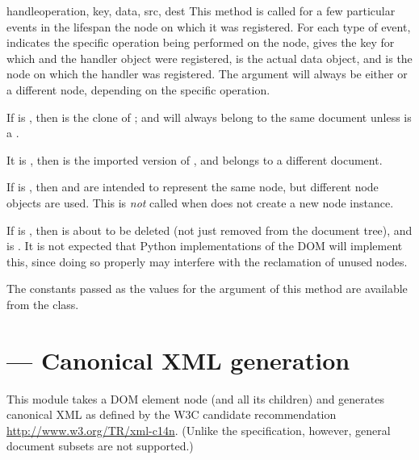 \documentclass{howto}
\begin{document}
\begin{methoddesc}[UserDataHandler]{handle}{operation, key, data, src, dest}
  This method is called for a few particular events in the lifespan
  the node on which it was registered.  For each type of event,
   indicates the specific operation being performed on
  the node,  gives the key for which  and the
  handler object were registered,  is the actual data
  object, and  is the node on which the handler was
  registered.  The  argument will always be either
   or a different node, depending on the specific
  operation.

  If  is , then  is the
  clone of ;  and  will always belong to
  the same document unless  is a
  .

  It  is , then  is
  the imported version of , and belongs to a different
  document.

  If  is , then  and
   are intended to represent the same node, but different
  node objects are used.  This is \emph{not} called when
   does not create a new node instance.

  If  is , then  is
  about to be deleted (not just removed from the document tree), and
   is .  It is not expected that Python
  implementations of the DOM will implement this, since doing so
  properly may interfere with the reclamation of unused nodes.

  The constants passed as the values for the  argument
  of this method are available from the
   class.
\end{methoddesc}


\section{ ---
         Canonical XML generation}

This module takes a DOM element node (and all its children) and generates
canonical XML as defined by the W3C candidate recommendation
\url{http://www.w3.org/TR/xml-c14n}.
(Unlike the specification, however, general document subsets are not
supported.)
\end{document}
